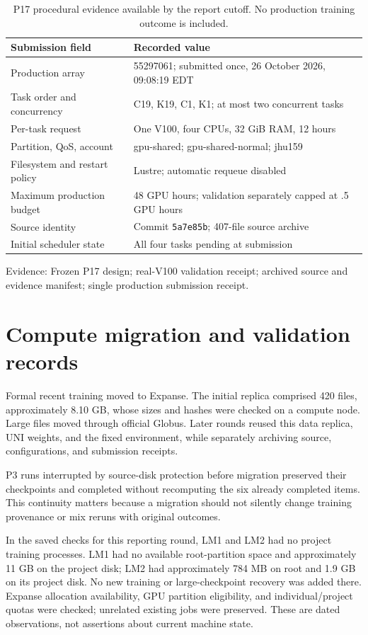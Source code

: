 \documentclass[11pt,a4paper]{article}
\newcommand{\src}[1]{\par{\footnotesize\color{gray}Evidence: #1}\par}
\begin{document}
\begin{table}[H]\centering\small
\begin{tabularx}{\linewidth}{p{42mm}X}\toprule
Submission field & Recorded value\\\midrule
Production array & 55297061; submitted once, 26 October 2026, 09:08:19 EDT\\
Task order and concurrency & C19, K19, C1, K1; at most two concurrent tasks\\
Per-task request & One V100, four CPUs, 32 GiB RAM, 12 hours\\
Partition, QoS, account & gpu-shared; gpu-shared-normal; jhu159\\
Filesystem and restart policy & Lustre; automatic requeue disabled\\
Maximum production budget & 48 GPU hours; validation separately capped at .5 GPU hours\\
Source identity & Commit \texttt{5a7e85b}; 407-file source archive\\
Initial scheduler state & All four tasks pending at submission\\\bottomrule
\end{tabularx}
\caption{P17 procedural evidence available by the report cutoff. No production training outcome is included.}
\end{table}

\src{Frozen P17 design; real-V100 validation receipt; archived source and evidence manifest; single production submission receipt.}

\section{Compute migration and validation records}

Formal recent training moved to Expanse. The initial replica comprised 420 files, approximately 8.10 GB, whose sizes and hashes were checked on a compute node. Large files moved through official Globus. Later rounds reused this data replica, UNI weights, and the fixed environment, while separately archiving source, configurations, and submission receipts.

P3 runs interrupted by source-disk protection before migration preserved their checkpoints and completed without recomputing the six already completed items. This continuity matters because a migration should not silently change training provenance or mix reruns with original outcomes.

In the saved checks for this reporting round, LM1 and LM2 had no project training processes. LM1 had no available root-partition space and approximately 11 GB on the project disk; LM2 had approximately 784 MB on root and 1.9 GB on its project disk. No new training or large-checkpoint recovery was added there. Expanse allocation availability, GPU partition eligibility, and individual/project quotas were checked; unrelated existing jobs were preserved. These are dated observations, not assertions about current machine state.
\end{document}
